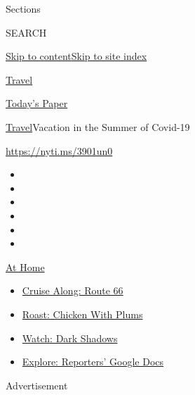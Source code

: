 Sections

SEARCH

\protect\hyperlink{site-content}{Skip to
content}\protect\hyperlink{site-index}{Skip to site index}

\href{https://www.nytimes3xbfgragh.onion/section/travel}{Travel}

\href{https://myaccount.nytimes3xbfgragh.onion/auth/login?response_type=cookie\&client_id=vi}{}

\href{https://www.nytimes3xbfgragh.onion/section/todayspaper}{Today's
Paper}

\href{/section/travel}{Travel}\textbar{}Vacation in the Summer of
Covid-19

\url{https://nyti.ms/3901un0}

\begin{itemize}
\item
\item
\item
\item
\item
\item
\end{itemize}

\href{https://www.nytimes3xbfgragh.onion/spotlight/at-home?action=click\&pgtype=Article\&state=default\&region=TOP_BANNER\&context=at_home_menu}{At
Home}

\begin{itemize}
\tightlist
\item
  \href{https://www.nytimes3xbfgragh.onion/2020/09/07/travel/route-66.html?action=click\&pgtype=Article\&state=default\&region=TOP_BANNER\&context=at_home_menu}{Cruise
  Along: Route 66}
\item
  \href{https://www.nytimes3xbfgragh.onion/2020/09/04/dining/sheet-pan-chicken.html?action=click\&pgtype=Article\&state=default\&region=TOP_BANNER\&context=at_home_menu}{Roast:
  Chicken With Plums}
\item
  \href{https://www.nytimes3xbfgragh.onion/2020/09/04/arts/television/dark-shadows-stream.html?action=click\&pgtype=Article\&state=default\&region=TOP_BANNER\&context=at_home_menu}{Watch:
  Dark Shadows}
\item
  \href{https://www.nytimes3xbfgragh.onion/interactive/2020/at-home/even-more-reporters-editors-diaries-lists-recommendations.html?action=click\&pgtype=Article\&state=default\&region=TOP_BANNER\&context=at_home_menu}{Explore:
  Reporters' Google Docs}
\end{itemize}

Advertisement

